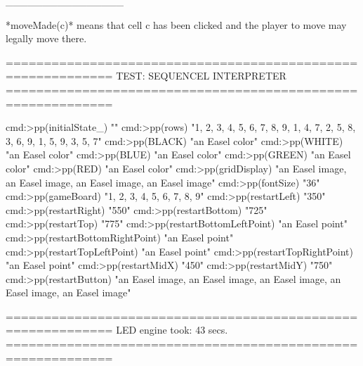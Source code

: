 \documentclass{led_doc}
\begin{document}
\begin{ledCmnt}
________________

*moveMade(c)* means that cell c has been clicked and the player to move may legally move there.
\end{ledCmnt}

\begin{ledDef}
\end{ledDef}

\begin{ledDef}
\end{ledDef}

\begin{ledDef}
\end{ledDef}

\begin{ledCmnt}
============================================================
TEST: SEQUENCEL INTERPRETER
============================================================

cmd:>pp(initialState_)
"{}"
cmd:>pp(rows)
"{{1, 2, 3}, {4, 5, 6}, {7, 8, 9}, {1, 4, 7}, {2, 5, 8}, {3, 6, 9}, {1, 5, 9}, {3, 5, 7}}"
cmd:>pp(BLACK)
"an Easel color"
cmd:>pp(WHITE)
"an Easel color"
cmd:>pp(BLUE)
"an Easel color"
cmd:>pp(GREEN)
"an Easel color"
cmd:>pp(RED)
"an Easel color"
cmd:>pp(gridDisplay)
"{an Easel image, an Easel image, an Easel image, an Easel image}"
cmd:>pp(fontSize)
"36"
cmd:>pp(gameBoard)
"{1, 2, 3, 4, 5, 6, 7, 8, 9}"
cmd:>pp(restartLeft)
"350"
cmd:>pp(restartRight)
"550"
cmd:>pp(restartBottom)
"725"
cmd:>pp(restartTop)
"775"
cmd:>pp(restartBottomLeftPoint)
"an Easel point"
cmd:>pp(restartBottomRightPoint)
"an Easel point"
cmd:>pp(restartTopLeftPoint)
"an Easel point"
cmd:>pp(restartTopRightPoint)
"an Easel point"
cmd:>pp(restartMidX)
"450"
cmd:>pp(restartMidY)
"750"
cmd:>pp(restartButton)
"{an Easel image, an Easel image, an Easel image, an Easel image, an Easel image}"

============================================================
LED engine took: 43 secs.
============================================================
\end{ledCmnt}
\end{document}
